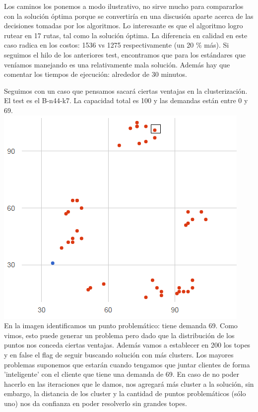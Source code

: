 \documentclass[11pt,a4paper]{article}
\begin{document}
\bigskip
Los caminos los ponemos a modo ilustrativo, no sirve mucho para compararlos con la solución óptima porque se convertiría en una discusión aparte acerca de las decisiones tomadas por los algoritmos. Lo interesante es que el algoritmo logro rutear en 17 rutas, tal como la solución óptima. La diferencia en calidad en este caso radica en los costos: 1536 vs 1275 respectivamente (un 20 \% más). Si seguimos el hilo de los anteriores test, encontramos que para los estándares que veníamos manejando es una relativamente mala solución. Además hay que comentar los tiempos de ejecución: alrededor de 30 minutos.


\bigskip


Seguimos con un caso que pensamos sacará ciertas ventajas en la clusterización. El test es el B-n44-k7. 
La capacidad total es 100 y las demandas están entre 0 y 69.
\\
\includegraphics[scale=.5]{graficos/B-n44-k7/prev.png}
\\En la imagen identificamos un punto problemático: tiene demanda 69. Como vimos, esto puede generar un problema pero dado que la distribución de los puntos nos conceda ciertas ventajas. Además vamos a establecer en 200 los topes y en false el flag de seguir buscando solución con más clusters. Los mayores problemas suponemos que estarán cuando tengamos que juntar clientes de forma 'inteligente'  con el cliente que tiene una demanda de 69. En caso de no poder hacerlo en las iteraciones que le damos, nos agregará más cluster a la solución, sin embargo, la distancia de los cluster y la cantidad de puntos problemáticos (sólo uno) nos da confianza en poder resolverlo sin grandes topes.
\end{document}

